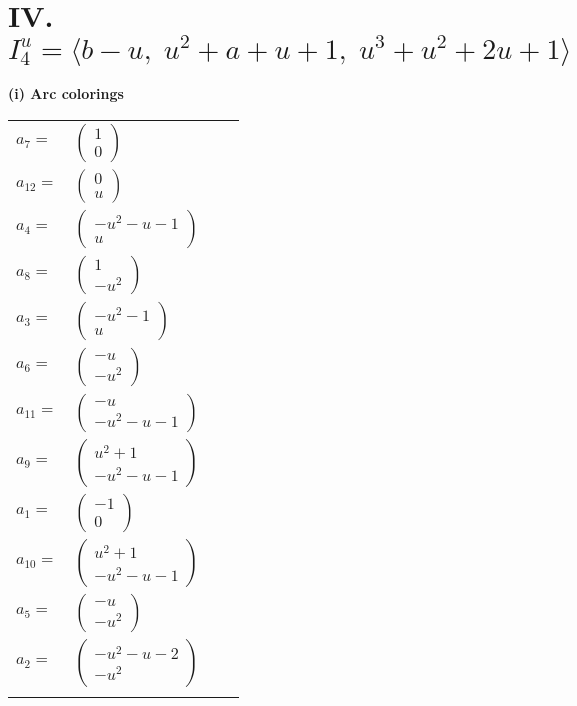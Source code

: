 \documentclass[1p]{elsarticle_modified}
\theoremstyle{definition}
\begin{document}
\centering \section*{IV. $I^u_{4}= \langle b- u,\;u^2+a+u+1,\;u^3+u^2+2 u+1 \rangle$}
\flushleft \textbf{(i) Arc colorings}\\
\begin{tabular}{m{7pt} m{180pt} m{7pt} m{180pt} }
\flushright $a_{7}=$&$\begin{pmatrix}1\\0\end{pmatrix}$ \\
\flushright $a_{12}=$&$\begin{pmatrix}0\\u\end{pmatrix}$ \\
\flushright $a_{4}=$&$\begin{pmatrix}- u^2- u-1\\u\end{pmatrix}$ \\
\flushright $a_{8}=$&$\begin{pmatrix}1\\- u^2\end{pmatrix}$ \\
\flushright $a_{3}=$&$\begin{pmatrix}- u^2-1\\u\end{pmatrix}$ \\
\flushright $a_{6}=$&$\begin{pmatrix}- u\\- u^2\end{pmatrix}$ \\
\flushright $a_{11}=$&$\begin{pmatrix}- u\\- u^2- u-1\end{pmatrix}$ \\
\flushright $a_{9}=$&$\begin{pmatrix}u^2+1\\- u^2- u-1\end{pmatrix}$ \\
\flushright $a_{1}=$&$\begin{pmatrix}-1\\0\end{pmatrix}$ \\
\flushright $a_{10}=$&$\begin{pmatrix}u^2+1\\- u^2- u-1\end{pmatrix}$ \\
\flushright $a_{5}=$&$\begin{pmatrix}- u\\- u^2\end{pmatrix}$ \\
\flushright $a_{2}=$&$\begin{pmatrix}- u^2- u-2\\- u^2\end{pmatrix}$\\&\end{tabular}
\end{document}
